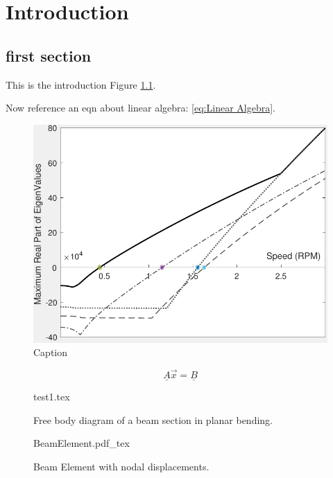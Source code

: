 \chapter{Introduction}
\section{first section}
This is the introduction Figure \ref{fig:my_label}.

Now reference an eqn about linear algebra: \eqref{eq:Linear Algebra}.
\begin{figure}
    \centering
    \includegraphics[width=\linewidth]{figures/StabilityMargin.pdf}
    \caption{Caption}
    \label{fig:my_label}
\end{figure}
\begin{equation} \label{eq:Linear Algebra}
\underline{A}\vec{x}=\underline{B}
\end{equation}

\begin{figure}
	
	\centering
	{test1.tex}
	\caption{Free body diagram of a beam section in planar bending.}
	\label{fig:test1}
\end{figure}
\begin{figure}
	\centering
	\def\svgwidth{400pt}
	{BeamElement.pdf_tex}
	\caption{Beam Element with nodal displacements.}
	\label{fig:BeamElem}
\end{figure}